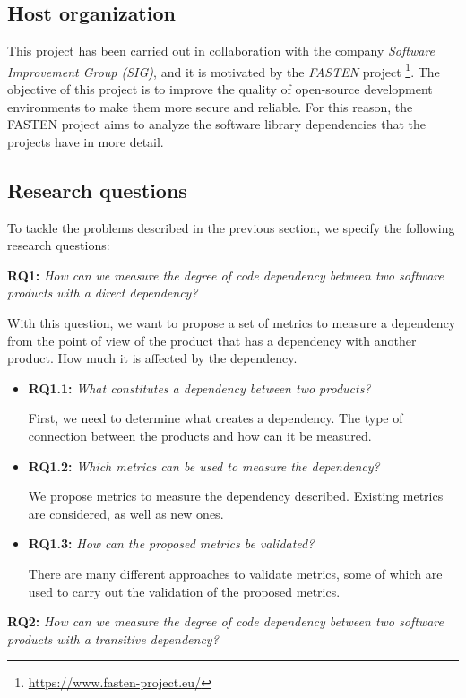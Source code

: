 \subsection{Host organization}
This project has been carried out in collaboration with the company \textit{Software Improvement Group (SIG)}, and it is motivated by the \textit{FASTEN} project \footnote{\url{https://www.fasten-project.eu/}}. The objective of this project is to improve the quality of open-source development environments to make them more secure and reliable. For this reason, the FASTEN project aims to analyze the software library dependencies that the projects have in more detail.

\subsection{Research questions}
To tackle the problems described in the previous section, we specify the following research questions:

\blankl
\textbf{RQ1:} \textit{How can we measure the degree of code dependency between two software products with a direct dependency?}

\blankls
With this question, we want to propose a set of metrics to measure a dependency from the point of view of the product that has a dependency with another product. How much it is affected by the dependency.

\begin{itemize}
  \item \textbf{RQ1.1:} \textit{What constitutes a dependency between two products?}

  First, we need to determine what creates a dependency. The type of connection between the products and how can it be measured.

  \item \textbf{RQ1.2:} \textit{Which metrics can be used to measure the dependency?}

  We propose metrics to measure the dependency described. Existing metrics are considered, as well as new ones.

  \item \textbf{RQ1.3:} \textit{How can the proposed metrics be validated?}

  There are many different approaches to validate metrics, some of which are used to carry out the validation of the proposed metrics.
\end{itemize}

\blankl
\textbf{RQ2:} \textit{How can we measure the degree of code dependency between two software products with a transitive dependency?} 

